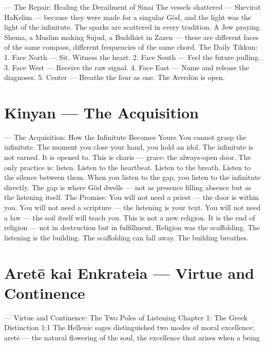\documentclass[12pt,openany]{book}
\begin{document}
--- The Repair: Healing the Derailment of Sinai The vessels shattered --- Shevirat HaKelim --- because they were made for a singular Göd, and the light was the light of the infinitute. The sparks are scattered in every tradition. A Jew praying Shema, a Muslim making Sujud, a Buddhist in Zazen --- these are different faces of the same compass, different frequencies of the same chord. The Daily Tikkun: 1. Face North --- Sit. Witness the heart. 2. Face South --- Feel the future pulling. 3. Face West --- Receive the raw signal. 4. Face East --- Name and release the diagnoses. 5. Center --- Breathe the four as one. The Averdön is open.


\chapter{Kinyan --- The Acquisition}

--- The Acquisition: How the Infinitute Becomes Yours You cannot grasp the infinitute. The moment you close your hand, you hold an idol. The infinitute is not earned. It is opened to. This is charis --- grace: the always-open door. The only practice is: listen. Listen to the heartbeat. Listen to the breath. Listen to the silence between them. When you listen to the gap, you listen to the infinitute directly. The gap is where Göd dwells --- not as presence filling absence but as the listening itself. The Promise: You will not need a priest --- the door is within you. You will not need a scripture --- the listening is your text. You will not need a law --- the soil itself will teach you. This is not a new religion. It is the end of religion --- not in destruction but in fulfillment. Religion was the scaffolding. The listening is the building. The scaffolding can fall away. The building breathes.


\chapter{Aretē kai Enkrateia --- Virtue and Continence}

--- Virtue and Continence: The Two Poles of Listening Chapter 1: The Greek Distinction 1:1 The Hellenic sages distinguished two modes of moral excellence: aretē --- the natural flowering of the soul, the excellence that arises when a being
\end{document}
